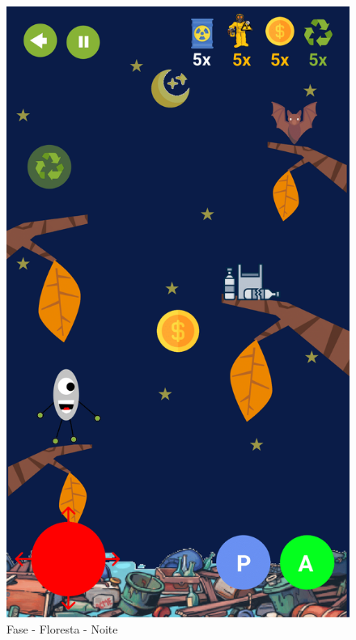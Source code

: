 \documentclass[]{scrartcl}
\begin{document}
\begin{figure}[H]
	\begin{center}
		\includegraphics[scale=0.3]{figs/Game Design-15.png}
		\caption{Fase - Floresta - Noite}
	\end{center}
\end{figure}
\end{document}
